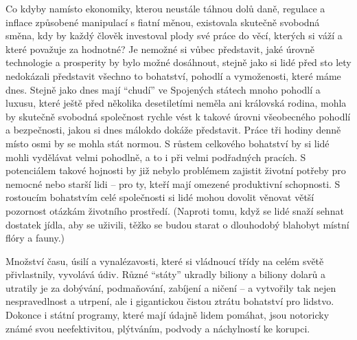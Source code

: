 \documentclass{book}
\begin{document}
Co kdyby namísto ekonomiky, kterou neustále táhnou dolů daně, regulace a inflace způsobené manipulací s fiatní měnou, existovala skutečně svobodná směna, kdy by každý člověk investoval plody své práce do věcí, kterých si váží a které považuje za hodnotné? Je nemožné si vůbec představit, jaké úrovně technologie a prosperity by bylo možné dosáhnout, stejně jako si lidé před sto lety nedokázali představit všechno to bohatství, pohodlí a vymoženosti, které máme dnes. Stejně jako dnes mají \enquote{chudí} ve Spojených státech mnoho pohodlí a luxusu, které ještě před několika desetiletími neměla ani královská rodina, mohla by skutečně svobodná společnost rychle vést k takové úrovni všeobecného pohodlí a bezpečnosti, jakou si dnes málokdo dokáže představit. Práce tři hodiny denně místo osmi by se mohla stát normou. S růstem celkového bohatství by si lidé mohli vydělávat velmi pohodlně, a to i při velmi podřadných pracích. S potenciálem takové hojnosti by již nebylo problémem zajistit životní potřeby pro nemocné nebo starší lidi -- pro ty, kteří mají omezené produktivní schopnosti. S rostoucím bohatstvím celé společnosti si lidé mohou dovolit věnovat větší pozornost otázkám životního prostředí. (Naproti tomu, když se lidé snaží sehnat dostatek jídla, aby se uživili, těžko se budou starat o dlouhodobý blahobyt místní flóry a fauny.)

Množství času, úsilí a vynalézavosti, které si vládnoucí třídy na celém světě přivlastnily, vyvolává údiv. Různé \enquote{státy} ukradly biliony a biliony dolarů a utratily je za dobývání, podmaňování, zabíjení a ničení -- a vytvořily tak nejen nespravedlnost a utrpení, ale i gigantickou čistou ztrátu bohatství pro lidstvo. Dokonce i státní programy, které mají údajně lidem pomáhat, jsou notoricky známé svou neefektivitou, plýtváním, podvody a náchylností ke korupci.
\end{document}
